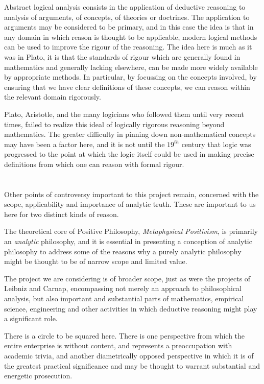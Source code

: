 Abstract logical analysis consists in the application of deductive
reasoning to analysis of arguments, of concepts, of theories or
doctrines. 
The application to arguments may be considered to be primary, and in
this case the idea is that in any domain in which reason is thought to
be applicable, modern logical methods can be used to improve the
rigour of the reasoning. 
The idea here is much as it was in Plato, it is that the standards of
rigour which are generally found in mathematics and generally lacking
elsewhere, can be made more widely available by appropriate methods. 
In particular, by focussing on the concepts involved, by ensuring that
we have clear definitions of these concepts, we can reason within the
relevant domain rigorously.

Plato, Aristotle, and the many logicians who followed them until very
recent times, failed to realize this ideal of logically rigorous
reasoning beyond mathematics.
The greater difficulty in pinning down non-mathematical concepts may
have been a factor here, and it is not until the $19^{th}$ century
that logic was progressed to the point at which the logic itself could
be used in making precise definitions from which one can reason with
formal rigour. 

\section{}

Other points of controversy important to this project remain,
concerned with the scope, applicability and importance of analytic
truth.
These are important to us here for two distinct kinds of reason.

The theoretical core of Positive Philosophy, \emph{Metaphysical
  Positivism}, is primarily an \emph{analytic} philosophy, and it is
essential in presenting a conception of analytic philosophy to address
some of the reasons why a purely analytic philosophy might be thought
to be of narrow scope and limited value.

The project we are considering is of broader scope, just as were the
projects of Leibniz and Carnap, encompassing not merely an approach to
philosophical analysis, but also important and substantial parts of
mathematics, empirical science, engineering and other activities in
which deductive reasoning might play a significant role.

There is a circle to be squared here.
There is one perspective from which the entire enterprise is without
content, and represents a preoccupation with academic trivia, and
another diametrically opposed perspective in which it is of the
greatest practical significance and may be thought to warrant
substantial and energetic prosecution.

